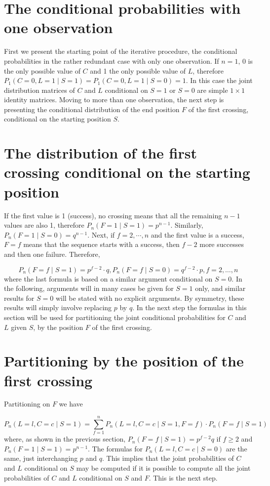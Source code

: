 \section{The conditional probabilities with one observation}

First we present the starting point of the iterative procedure, the conditional probabilities in  the rather redundant case with only one observation. If $n = 1$, 0 is the only possible value of $C$ and 1 the only possible value of $L$, therefore $P_1 (C=0,L=1 \mid S=1) = P_1 (C=0,L=1 \mid S=0) = 1$. In this case the joint distribution matrices of $C$ and $L$ conditional on $S=1$ or $S=0$ are simple $1 \times 1$ identity matrices. Moving to more than one observation, the next step is presenting the conditional distribution of the end position $F$ of the first crossing, conditional on the starting position  $S$.

\section{The distribution of the first crossing conditional on the starting position}

If the first value is 1 (success), no crossing means that all the remaining $n-1$ values are also 1, therefore $P_n (F=1 \mid S=1) = p^{n-1}$. Similarly, $P_n(F=1 \mid S=0) = q^{n-1}$. Next, if $f=2, \cdots ,n$ and the first value is a success, $F=f$ means that the sequence starts with a success, then $f-2$ more successes and then one failure. Therefore, 

$$P_n (F=f \mid S=1) = p^{f-2} \cdot q, P_n (F=f \mid S=0) =q^{f-2} \cdot p, f=2, \ldots ,n$$ where the last formula is based on a similar argument conditional on $S = 0$. In the following, arguments will in many cases be given for $S = 1$ only, and similar results for $S = 0$ will be stated with no explicit arguments. By symmetry, these results will simply involve replacing $p$ by $q$. In the next step the formulas in this section will be used for partitioning the joint conditional probabilities for $C$ and $L$ given $S$, by the position $F$ of the first crossing. 

\section{Partitioning by the position of the first crossing}

Partitioning on  $F$ we have

$$P_n (L=l,C=c \mid S=1) = \sum_{f=1}^n P_n(L=l,C=c \mid S=1,F=f) \cdot P_n (F=f \mid S=1)$$ where, as shown in the previous section, $P_n (F=f \mid S=1) =p^{f-2}q$ if $f \geq 2$ and $P_n (F=1 \mid S=1) = p^{n-1}$. The formulas for $P_n (L=l,C=c \mid S=0)$ are the same, just interchanging $p$ and $q$. This implies that the joint probabilities of $C$ and $L$ conditional on $S$ may be computed if it is possible to compute all the joint probabilities of $C$ and $L$ conditional on $S$ and $F$. This is the next step.

